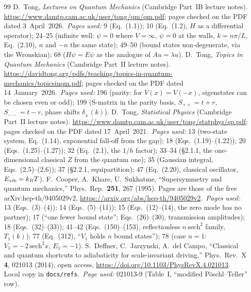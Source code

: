 \documentclass[11pt]{article}
\numberwithin{equation}{section}
\newcommand{\kB}{k_B}
\begin{document}
\begin{thebibliography}{99}
 D.~Tong, \emph{Lectures on Quantum Mechanics} (Cambridge Part~IB lecture notes). \url{https://www.damtp.cam.ac.uk/user/tong/qm/qm.pdf}; pages checked on the PDF dated 3~April~2026.\
\emph{Pages used:} 9 (Eq.~(1.1)); 10 (Eq.~(1.2), $H$ as a differential operator); 24--25 (infinite well: $\psi=0$ where $V=\infty$, $\psi=0$ at the walls, $k=n\pi/L$, Eq.~(2.10), $n$ and $-n$ the same state); 49--50 (bound states non-degenerate, via the Wronskian); 68 ($H\psi=E\psi$ as the analogue of $Au=\lambda u$).
\bibitem[Tong-Topics]{tongTopics} D.~Tong, \emph{Topics in Quantum Mechanics} (Cambridge Part~II lecture notes). \url{https://davidtong.org/pdfs/teaching/topics-in-quantum-mechanics/topicsinqm.pdf}; pages checked on the PDF dated 14~January~2026.\
\emph{Pages used:} 196 (parity: for $V(x)=V(-x)$, eigenstates can be chosen even or odd); 199 (S-matrix in the parity basis, $S_{++}=t+r$, $S_{--}=t-r$, phase shifts $\delta_\pm(k)$).
\bibitem[Tong-SP]{tongSP} D.~Tong, \emph{Statistical Physics} (Cambridge Part~II lecture notes). \url{https://www.damtp.cam.ac.uk/user/tong/statphys/sp.pdf}; pages checked on the PDF dated 17~April~2021.\
\emph{Pages used:} 13 (two-state system, Eq.~(1.14), exponential fall-off from the gap); 18 (Eqs.~(1.19)--(1.22)); 20 (Eqs.~(1.25)--(1.27)); 32 (Eq.~(2.1), the $1/h$ factor); 33--34 (\S2.1.1, the one-dimensional classical $Z$ from the quantum one); 35 (Gaussian integral, Eqs.~(2.5)--(2.6)); 37 (\S2.2.1, equipartition); 47 (Eq.~(2.20), classical oscillator, $E_{\rm vib}=\kB T$).
\bibitem[CKS]{CKS} F.~Cooper, A.~Khare, U.~Sukhatme, ``Supersymmetry and quantum mechanics,'' Phys.\ Rep.\ \textbf{251}, 267 (1995). Pages are those of the free arXiv:hep-th/9405029v2, \url{https://arxiv.org/abs/hep-th/9405029v2}.\
\emph{Pages used:} 13 (Eqs.~(3)--(4)); 14 (Eqs.~(5)--(11)); 15 (Eqs.~(12)--(14), the zero mode has no partner); 17 (``one fewer bound state''; Eqs.~(26)--(30), transmission amplitudes); 18 (Eqs.~(32)--(33)); 41--42 (Eqs.~(150)--(153), reflectionless $n\,\mathrm{sech}^2$ family, $T_1(k)$); 77 (Eq.~(312), ``$V_1$ holds $n$ bound states''); 78 (case $n=1$: $V_1=-2\,\mathrm{sech}^2x$, $E_1=-1$).
\bibitem[DJdC]{deffner} S.~Deffner, C.~Jarzynski, A.~del Campo, ``Classical and quantum shortcuts to adiabaticity for scale-invariant driving,'' Phys.\ Rev.\ X \textbf{4}, 021013 (2014), open access, \url{https://doi.org/10.1103/PhysRevX.4.021013}. Local copy in \texttt{docs/refs}.\
\emph{Page used:} 021013-9 (Table~I, ``modified P\"oschl--Teller'' row).

\end{thebibliography}
\end{document}
